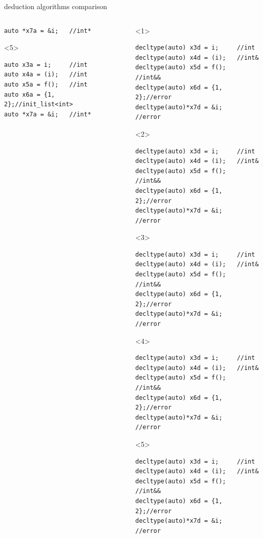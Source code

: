 \documentclass[10pt]{beamer}
\begin{document}
\begin{frame}[fragile]{deduction algorithms comparison}
\begin{columns}
\begin{column}{0.48\linewidth}
\begin{onlyenv}
\begin{verbatim}
auto *x7a = &i;   //int*
		\end{verbatim}
	\end{onlyenv}
	\begin{onlyenv}
		\begin{verbatim}
auto x3a = i;     //int
auto x4a = (i);   //int
auto x5a = f();   //int
auto x6a = {1, 2};//init_list<int>
auto *x7a = &i;   //int*
		\end{verbatim}
	\end{onlyenv}
	\end{column}
	\begin{column}{0.48\linewidth}
	\begin{onlyenv}
	\begin{verbatim}
decltype(auto) x3d = i;     //int
decltype(auto) x4d = (i);   //int&
decltype(auto) x5d = f();   //int&&
decltype(auto) x6d = {1, 2};//error
decltype(auto)*x7d = &i;    //error
	\end{verbatim}
	\end{onlyenv}
	\begin{onlyenv}
	\begin{verbatim}
decltype(auto) x3d = i;     //int
decltype(auto) x4d = (i);   //int&
decltype(auto) x5d = f();   //int&&
decltype(auto) x6d = {1, 2};//error
decltype(auto)*x7d = &i;    //error
	\end{verbatim}
	\end{onlyenv}
	\begin{onlyenv}
	\begin{verbatim}
decltype(auto) x3d = i;     //int
decltype(auto) x4d = (i);   //int&
decltype(auto) x5d = f();   //int&&
decltype(auto) x6d = {1, 2};//error
decltype(auto)*x7d = &i;    //error
	\end{verbatim}
	\end{onlyenv}
	\begin{onlyenv}
	\begin{verbatim}
decltype(auto) x3d = i;     //int
decltype(auto) x4d = (i);   //int&
decltype(auto) x5d = f();   //int&&
decltype(auto) x6d = {1, 2};//error
decltype(auto)*x7d = &i;    //error
	\end{verbatim}
	\end{onlyenv}
	\begin{onlyenv}
	\begin{verbatim}
decltype(auto) x3d = i;     //int
decltype(auto) x4d = (i);   //int&
decltype(auto) x5d = f();   //int&&
decltype(auto) x6d = {1, 2};//error
decltype(auto)*x7d = &i;    //error
	\end{verbatim}
	\end{onlyenv}			
	\end{column}
	\end{columns}
\end{frame}
\end{document}
